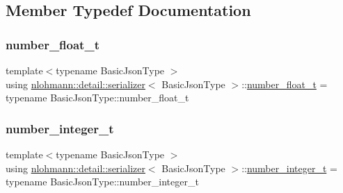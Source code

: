 \subsection{Member Typedef Documentation}
\mbox{\label{classnlohmann_1_1detail_1_1serializer_a460c6794fbabbb2ae83380e987a6c030}} 
\subsubsection{\texorpdfstring{number\_float\_t}{number\_float\_t}}
{\footnotesize\ttfamily template$<$typename Basic\+Json\+Type $>$ \\
using \mbox{\hyperlink{classnlohmann_1_1detail_1_1serializer}{nlohmann\+::detail\+::serializer}}$<$ Basic\+Json\+Type $>$\+::\mbox{\hyperlink{classnlohmann_1_1detail_1_1serializer_a460c6794fbabbb2ae83380e987a6c030}{number\+\_\+float\+\_\+t}} =  typename Basic\+Json\+Type\+::number\+\_\+float\+\_\+t\hspace{0.3cm}{\ttfamily [private]}}

\mbox{\label{classnlohmann_1_1detail_1_1serializer_ae7b1df1c70bdec1371f297567726a198}} 
\subsubsection{\texorpdfstring{number\_integer\_t}{number\_integer\_t}}
{\footnotesize\ttfamily template$<$typename Basic\+Json\+Type $>$ \\
using \mbox{\hyperlink{classnlohmann_1_1detail_1_1serializer}{nlohmann\+::detail\+::serializer}}$<$ Basic\+Json\+Type $>$\+::\mbox{\hyperlink{classnlohmann_1_1detail_1_1serializer_ae7b1df1c70bdec1371f297567726a198}{number\+\_\+integer\+\_\+t}} =  typename Basic\+Json\+Type\+::number\+\_\+integer\+\_\+t\hspace{0.3cm}{\ttfamily [private]}}

